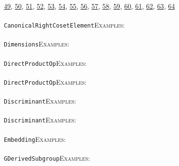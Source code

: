 \documentclass[a4paper,11pt]{report}
\begin{document}
{{\href{../www/SideLinks/About/aboutSpaceGroup.html} {49}{\nobreakspace}, \href{../www/SideLinks/About/aboutFunctorial.html} {50}{\nobreakspace}, \href{../www/SideLinks/About/aboutSuperperfect.html} {51}{\nobreakspace}, \href{../www/SideLinks/About/aboutGouter.html} {52}{\nobreakspace}, \href{../www/SideLinks/About/aboutSurvey.html} {53}{\nobreakspace}, \href{../www/SideLinks/About/aboutGraphsOfGroups.html} {54}{\nobreakspace}, \href{../www/SideLinks/About/aboutTDA.html} {55}{\nobreakspace}, \href{../www/SideLinks/About/aboutIntro.html} {56}{\nobreakspace}, \href{../www/SideLinks/About/aboutKnots.html} {57}{\nobreakspace}, \href{../www/SideLinks/About/aboutTensorSquare.html} {58}{\nobreakspace}, \href{../www/SideLinks/About/aboutKnotsQuandles.html} {59}{\nobreakspace}, \href{../www/SideLinks/About/aboutTopology.html} {60}{\nobreakspace}, \href{../www/SideLinks/About/aboutLieCovers.html} {61}{\nobreakspace}, \href{../www/SideLinks/About/aboutTorAndExt.html} {62}{\nobreakspace}, \href{../www/SideLinks/About/aboutLie.html} {63}{\nobreakspace}, \href{../www/SideLinks/About/aboutTwistedCoefficients.html} {64}{\nobreakspace} \\
 \\
 \texttt{CanonicalRightCosetElement}{\nobreakspace}{\nobreakspace}{\nobreakspace}{\nobreakspace}\textsc{Examples:} \\
 \\
 \texttt{Dimensions}{\nobreakspace}{\nobreakspace}{\nobreakspace}{\nobreakspace}\textsc{Examples:} \\
 \\
 \texttt{DirectProductOp}{\nobreakspace}{\nobreakspace}{\nobreakspace}{\nobreakspace}\textsc{Examples:} \\
 \\
 \texttt{DirectProductOp}{\nobreakspace}{\nobreakspace}{\nobreakspace}{\nobreakspace}\textsc{Examples:} \\
 \\
 \texttt{Discriminant}{\nobreakspace}{\nobreakspace}{\nobreakspace}{\nobreakspace}\textsc{Examples:} \\
 \\
 \texttt{Discriminant}{\nobreakspace}{\nobreakspace}{\nobreakspace}{\nobreakspace}\textsc{Examples:} \\
 \\
 \texttt{Embedding}{\nobreakspace}{\nobreakspace}{\nobreakspace}{\nobreakspace}\textsc{Examples:} \\
 \\
 \texttt{GDerivedSubgroup}{\nobreakspace}{\nobreakspace}{\nobreakspace}{\nobreakspace}\textsc{Examples:} \\
}}
\end{document}
